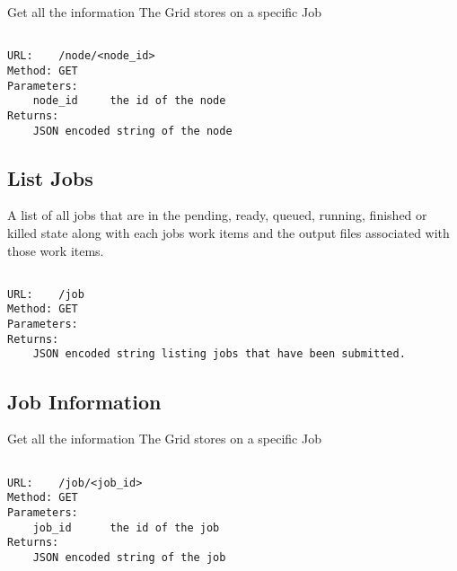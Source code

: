 Get all the information The Grid stores on a specific Job

\begin{adjustwidth}{2.5em}{2.5em}
\begin{verbatim}

URL:    /node/<node_id>
Method: GET
Parameters:
    node_id     the id of the node
Returns:    
    JSON encoded string of the node

\end{verbatim}
\end{adjustwidth}

\subsection{List Jobs}
\label{listjobs}

A list of all jobs that are in the pending, ready, queued, running, finished or killed state along with each jobs work items and the output files associated with those work items.

\begin{adjustwidth}{2.5em}{2.5em}
\begin{verbatim}

URL:    /job
Method: GET
Parameters:
Returns:    
    JSON encoded string listing jobs that have been submitted.

\end{verbatim}
\end{adjustwidth}

\subsection{Job Information}
\label{jobinformation}

Get all the information The Grid stores on a specific Job

\begin{adjustwidth}{2.5em}{2.5em}
\begin{verbatim}

URL:    /job/<job_id>
Method: GET
Parameters:
    job_id      the id of the job
Returns:    
    JSON encoded string of the job

\end{verbatim}
\end{adjustwidth}
